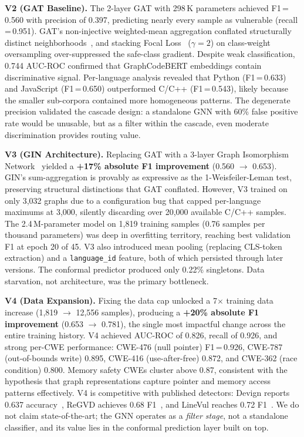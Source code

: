 \textbf{V2 (GAT Baseline).} The 2-layer GAT with 298\,K parameters achieved F1\,=\,0.560 with precision of 0.397, predicting nearly every sample as vulnerable (recall\,=\,0.951). GAT's non-injective weighted-mean aggregation conflated structurally distinct neighborhoods~\cite{xu2019gin}, and stacking Focal Loss~\cite{focalloss2017} ($\gamma=2$) on class-weight oversampling over-suppressed the safe-class gradient. Despite weak classification, 0.744 AUC-ROC confirmed that GraphCodeBERT embeddings contain discriminative signal. Per-language analysis revealed that Python (F1\,=\,0.633) and JavaScript (F1\,=\,0.650) outperformed C/C++ (F1\,=\,0.543), likely because the smaller sub-corpora contained more homogeneous patterns. The degenerate precision validated the cascade design: a standalone GNN with 60\% false positive rate would be unusable, but as a filter within the cascade, even moderate discrimination provides routing value.

\textbf{V3 (GIN Architecture).} Replacing GAT with a 3-layer Graph Isomorphism Network~\cite{xu2019gin} yielded a \textbf{+17\% absolute F1 improvement} (0.560 $\rightarrow$ 0.653). GIN's sum-aggregation is provably as expressive as the 1-Weisfeiler-Leman test, preserving structural distinctions that GAT conflated. However, V3 trained on only 3,032 graphs due to a configuration bug that capped per-language maximums at 3,000, silently discarding over 20,000 available C/C++ samples. The 2.4\,M-parameter model on 1,819 training samples (0.76 samples per thousand parameters) was deep in overfitting territory, reaching best validation F1 at epoch 20 of 45. V3 also introduced mean pooling (replacing CLS-token extraction) and a \texttt{language\_id} feature, both of which persisted through later versions. The conformal predictor produced only 0.22\% singletons. Data starvation, not architecture, was the primary bottleneck.

\textbf{V4 (Data Expansion).} Fixing the data cap unlocked a 7$\times$ training data increase (1,819 $\rightarrow$ 12,556 samples), producing a \textbf{+20\% absolute F1 improvement} (0.653 $\rightarrow$ 0.781), the single most impactful change across the entire training history. V4 achieved AUC-ROC of 0.826, recall of 0.926, and strong per-CWE performance: CWE-476 (null pointer) F1\,=\,0.926, CWE-787 (out-of-bounds write) 0.895, CWE-416 (use-after-free) 0.872, and CWE-362 (race condition) 0.800. Memory safety CWEs cluster above 0.87, consistent with the hypothesis that graph representations capture pointer and memory access patterns effectively. V4 is competitive with published detectors: Devign reports 0.637 accuracy~\cite{devign2019}, ReGVD achieves 0.68 F1~\cite{regvd2022}, and LineVul reaches 0.72 F1~\cite{linevul2022}. We do not claim state-of-the-art; the GNN operates as a \emph{filter stage}, not a standalone classifier, and its value lies in the conformal prediction layer built on top.

